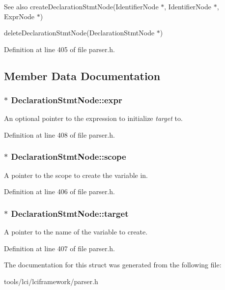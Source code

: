 \begin{DoxySeeAlso}{See also}
create\-Declaration\-Stmt\-Node(\-Identifier\-Node $\ast$, Identifier\-Node $\ast$, Expr\-Node $\ast$) 

delete\-Declaration\-Stmt\-Node(\-Declaration\-Stmt\-Node $\ast$) 
\end{DoxySeeAlso}


Definition at line 405 of file parser.\-h.



\subsection{Member Data Documentation}
\hypertarget{struct_declaration_stmt_node_aba3f89fdd66c4b0264490aa639a6bd6f}{
\subsubsection[{expr}]{$\ast$ {\bf Declaration\-Stmt\-Node\-::expr}}}\label{struct_declaration_stmt_node_aba3f89fdd66c4b0264490aa639a6bd6f}
An optional pointer to the expression to initialize {\itshape target\/} to. 

Definition at line 408 of file parser.\-h.

\hypertarget{struct_declaration_stmt_node_ab52e3859c15ef8b651f330bcd963c56c}{
\subsubsection[{scope}]{$\ast$ {\bf Declaration\-Stmt\-Node\-::scope}}}\label{struct_declaration_stmt_node_ab52e3859c15ef8b651f330bcd963c56c}
A pointer to the scope to create the variable in. 

Definition at line 406 of file parser.\-h.

\hypertarget{struct_declaration_stmt_node_a6fed156d07803ffd41487e873bcef98f}{
\subsubsection[{target}]{$\ast$ {\bf Declaration\-Stmt\-Node\-::target}}}\label{struct_declaration_stmt_node_a6fed156d07803ffd41487e873bcef98f}
A pointer to the name of the variable to create. 

Definition at line 407 of file parser.\-h.



The documentation for this struct was generated from the following file\-:\begin{DoxyCompactItemize}
\item 
tools/lci/lciframework/parser.\-h\end{DoxyCompactItemize}
